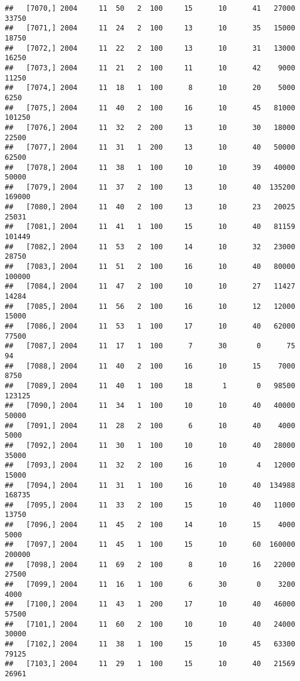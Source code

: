 \documentclass{article}\usepackage[]{graphicx}\usepackage[]{color}
\makeatletter
\newenvironment{kframe}{%
 \def\at@end@of@kframe{}%
 \ifinner\ifhmode%
  \def\at@end@of@kframe{\end{minipage}}%
  \begin{minipage}{\columnwidth}%
 \fi\fi%
 \def\FrameCommand##1{\hskip\@totalleftmargin \hskip-\fboxsep
 \colorbox{shadecolor}{##1}\hskip-\fboxsep
     \hskip-\linewidth \hskip-\@totalleftmargin \hskip\columnwidth}%
 \MakeFramed {\advance\hsize-\width
   \@totalleftmargin\z@ \linewidth\hsize
   \@setminipage}}%
 {\par\unskip\endMakeFramed%
 \at@end@of@kframe}
\newenvironment{knitrout}{}{} %
\makeatother
\begin{document}
\begin{knitrout}
\begin{kframe}
\begin{verbatim}
##   [7070,] 2004     11  50   2  100     15      10      41   27000   33750
##   [7071,] 2004     11  24   2  100     13      10      35   15000   18750
##   [7072,] 2004     11  22   2  100     13      10      31   13000   16250
##   [7073,] 2004     11  21   2  100     11      10      42    9000   11250
##   [7074,] 2004     11  18   1  100      8      10      20    5000    6250
##   [7075,] 2004     11  40   2  100     16      10      45   81000  101250
##   [7076,] 2004     11  32   2  200     13      10      30   18000   22500
##   [7077,] 2004     11  31   1  200     13      10      40   50000   62500
##   [7078,] 2004     11  38   1  100     10      10      39   40000   50000
##   [7079,] 2004     11  37   2  100     13      10      40  135200  169000
##   [7080,] 2004     11  40   2  100     13      10      23   20025   25031
##   [7081,] 2004     11  41   1  100     15      10      40   81159  101449
##   [7082,] 2004     11  53   2  100     14      10      32   23000   28750
##   [7083,] 2004     11  51   2  100     16      10      40   80000  100000
##   [7084,] 2004     11  47   2  100     10      10      27   11427   14284
##   [7085,] 2004     11  56   2  100     16      10      12   12000   15000
##   [7086,] 2004     11  53   1  100     17      10      40   62000   77500
##   [7087,] 2004     11  17   1  100      7      30       0      75      94
##   [7088,] 2004     11  40   2  100     16      10      15    7000    8750
##   [7089,] 2004     11  40   1  100     18       1       0   98500  123125
##   [7090,] 2004     11  34   1  100     10      10      40   40000   50000
##   [7091,] 2004     11  28   2  100      6      10      40    4000    5000
##   [7092,] 2004     11  30   1  100     10      10      40   28000   35000
##   [7093,] 2004     11  32   2  100     16      10       4   12000   15000
##   [7094,] 2004     11  31   1  100     16      10      40  134988  168735
##   [7095,] 2004     11  33   2  100     15      10      40   11000   13750
##   [7096,] 2004     11  45   2  100     14      10      15    4000    5000
##   [7097,] 2004     11  45   1  100     15      10      60  160000  200000
##   [7098,] 2004     11  69   2  100      8      10      16   22000   27500
##   [7099,] 2004     11  16   1  100      6      30       0    3200    4000
##   [7100,] 2004     11  43   1  200     17      10      40   46000   57500
##   [7101,] 2004     11  60   2  100     10      10      40   24000   30000
##   [7102,] 2004     11  38   1  100     15      10      45   63300   79125
##   [7103,] 2004     11  29   1  100     15      10      40   21569   26961

\end{verbatim}
\end{kframe}
\end{knitrout}
\end{document}
